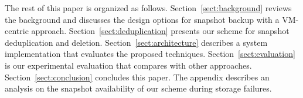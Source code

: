 
The rest of this paper is organized as follows.
Section~\ref{sect:background} reviews the background and discusses the  design options for snapshot backup 
with a VM-centric approach. 
Section~\ref{sect:deduplication}  presents our scheme for  snapshot deduplication and deletion.
Section~\ref{sect:architecture}  describes a system implementation that evaluates the proposed techniques.
Section~\ref{sect:evaluation} is our experimental evaluation that compares with other approaches.
Section~\ref{sect:conclusion}  concludes this paper.
The appendix describes an analysis on the snapshot availability of our scheme during storage failures.
